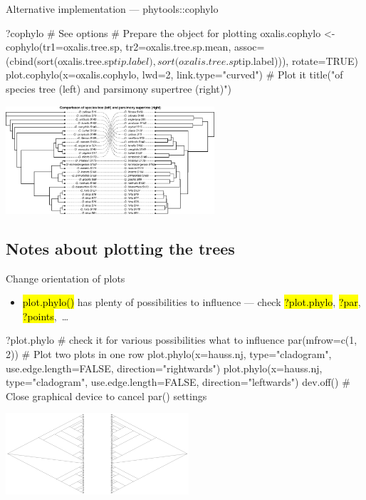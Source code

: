 \documentclass[compress, ucs, xelatex, 11pt, xcolor=svgnames,
  hyperref={
    bookmarks=true,
    unicode=true,
    colorlinks=true,
    pdftitle={Molecular data in R},
    plainpages=false,
    pdfauthor={Vojtech Zeisek},
    pdfsubject={Course about phylogeny and evolution in R},
    pdfcreator={XeLaTeX},
    pdfkeywords={R, evolution, phylogeny, molecular data},
    linkcolor=Tomato,
    anchorcolor=SaddleBrown,
    citecolor=Goldenrod,
    filecolor=DarkMagenta,
    menucolor=Sienna,
    urlcolor=DarkTurquoise,
    pdftex},
  url={hyphens, lowtilde} %
  ]{beamer}
\renewcommand{\texttt}[1]{\hl{\ttfamily #1}}
\begin{document}
\begin{frame}[fragile]{Alternative implementation --- phytools::cophylo}
  \begin{spluscode}
    ?cophylo # See options
    # Prepare the object for plotting
    oxalis.cophylo <- cophylo(tr1=oxalis.tree.sp, tr2=oxalis.tree.sp.mean,
      assoc=(cbind(sort(oxalis.tree.sp$tip.label),
      sort(oxalis.tree.sp$tip.label))), rotate=TRUE)
    plot.cophylo(x=oxalis.cophylo, lwd=2, link.type="curved") # Plot it
    title("\nComparisson of species tree (left) and parsimony supertree
      (right)")
  \end{spluscode}
  \begin{center}
    \includegraphics[height=4cm]{cophylo.png}
  \end{center}
\end{frame}

\subsection{Notes about plotting the trees}

\begin{frame}[fragile]{Change orientation of plots}
  \begin{itemize}
    \item \alert{\texttt{plot.phylo()} has plenty of possibilities to influence --- check \texttt{?plot.phylo}, \texttt{?par}, \texttt{?points},~\ldots}
  \end{itemize}
  \begin{spluscode}
    ?plot.phylo # check it for various possibilities what to influence
    par(mfrow=c(1, 2)) # Plot two plots in one row
    plot.phylo(x=hauss.nj, type="cladogram", use.edge.length=FALSE,
      direction="rightwards")
    plot.phylo(x=hauss.nj, type="cladogram", use.edge.length=FALSE,
      direction="leftwards")
    dev.off() # Close graphical device to cancel par() settings
  \end{spluscode}
  \begin{center}
    \includegraphics[height=3cm]{lr.png}
  \end{center}
\end{frame}
\end{document}
